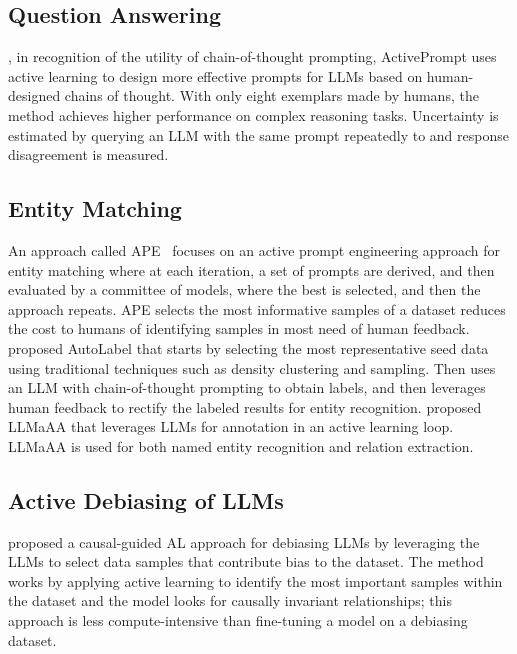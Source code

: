 \subsection{Question Answering}\label{apps-question-answering}
\citet{diao2023active}, in recognition of the utility of chain-of-thought prompting, ActivePrompt uses active learning to design more effective prompts for LLMs based on human-designed chains of thought. With only eight exemplars made by humans, the method achieves higher performance on complex reasoning tasks. Uncertainty is estimated by querying an LLM with the same prompt repeatedly to and response disagreement is measured.

\subsection{Entity Matching}\label{apps-entity-matching}

An approach called APE~\cite{qian2024ape} focuses on an active prompt engineering approach for entity matching where at each iteration, a set of prompts are derived, and then evaluated by a committee of models, where the best is selected, and then the approach repeats. APE selects the most informative samples of a dataset reduces the cost to humans of identifying samples in most need of human feedback. 
% 
\citet{ming2024autolabel} proposed AutoLabel that starts by selecting the most representative seed data using traditional techniques such as density clustering and sampling. Then uses an LLM with chain-of-thought prompting to obtain labels, and then leverages human feedback to rectify the labeled results for entity recognition.
% 
\citet{zhang2023llmaaa} proposed LLMaAA that leverages LLMs for annotation in an active learning loop. LLMaAA is used for both named entity recognition and relation extraction.



\subsection{Active Debiasing of LLMs}\label{apps-active-debiasing}

\citet{du2024causal} proposed a causal-guided AL approach for debiasing LLMs by leveraging the LLMs to select data samples that contribute bias to the dataset. The method works by applying active learning to identify the most important samples within the dataset and the model looks for causally invariant relationships; this approach is less compute-intensive than fine-tuning a model on a debiasing dataset.

